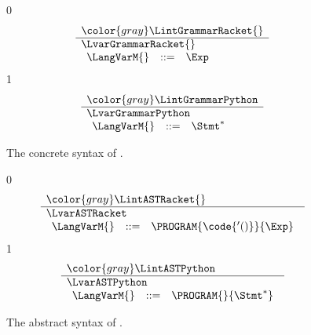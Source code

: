 \documentclass[7x10]{TimesAPriori_MIT}%
\newcommand{\gray}[1]{{\color{gray} #1}}
\def\racketEd{0}
\def\pythonEd{1}
\def\edition{0}
\numberwithin{theorem}{chapter}
\numberwithin{definition}{chapter}
\numberwithin{equation}{chapter}
\begin{document}
\begin{figure}[tp]
\centering
\begin{tcolorbox}[colback=white]
{\if\edition\racketEd
\[
\begin{array}{l}
   \gray{\LintGrammarRacket{}} \\ \hline
   \LvarGrammarRacket{}  \\
  \begin{array}{rcl}
    \LangVarM{} &::=& \Exp
  \end{array}
\end{array}
\]
\fi}
{\if\edition\pythonEd
\[
\begin{array}{l}
  \gray{\LintGrammarPython} \\ \hline
  \LvarGrammarPython \\
\begin{array}{rcl}
  \LangVarM{} &::=& \Stmt^{*}
\end{array}
\end{array}
\]
\fi}
\end{tcolorbox}
\caption{The concrete syntax of \LangVar{}.}
\label{fig:Lvar-concrete-syntax}
\end{figure}

\begin{figure}[tp]
\centering
\begin{tcolorbox}[colback=white]
{\if\edition\racketEd
\[
\begin{array}{l}
  \gray{\LintASTRacket{}} \\ \hline
  \LvarASTRacket \\
  \begin{array}{rcl}
    \LangVarM{} &::=& \PROGRAM{\code{'()}}{\Exp}
  \end{array}
\end{array}
\]
\fi}
{\if\edition\pythonEd
  \[
  \begin{array}{l}
  \gray{\LintASTPython}\\ \hline
  \LvarASTPython \\
\begin{array}{rcl}
\LangVarM{}  &::=& \PROGRAM{}{\Stmt^{*}}
\end{array}
\end{array}
\]
\fi}
\end{tcolorbox}
\caption{The abstract syntax of \LangVar{}.}
\label{fig:Lvar-syntax}
\end{figure}
\end{document}
